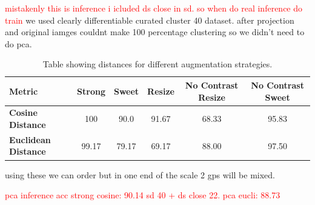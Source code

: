 \textcolor{red}{mistakenly this is inference i  icluded ds close in sd. so when do real inference do train}
we used clearly differentiable curated cluster 40 dataset. after projection and original iamges couldnt make 100 percentage clustering so we didn't need to do pca.
\begin{table}[H]
    \centering
    \begin{tabular}{@{}lccccc@{}}
    \toprule
    \textbf{Metric}          & \textbf{Strong} & \textbf{Sweet} & \textbf{Resize} & \textbf{No Contrast Resize} & \textbf{No Contrast Sweet} \\ \midrule
    \textbf{Cosine Distance} & 100               & 90.0              & 91.67               & 68.33                           & 95.83                          \\
    \textbf{Euclidean Distance} & 99.17           & 79.17              & 69.17               & 88.00                           & 97.50                          \\ \bottomrule
    \end{tabular}
    \caption{Table showing distances for different augmentation strategies.}
    \label{tab:distances}
  \end{table}

using these we can order but in one end of the scale 2 gps will be mixed.


\textcolor{red}{pca inference acc strong cosine: 90.14 sd 40 + ds close 22. pca eucli: 88.73}


